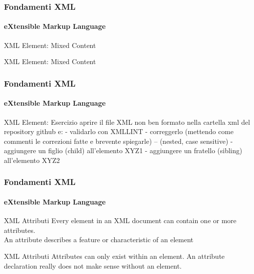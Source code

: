 \begin{frame}
    \frametitle{Fondamenti XML}
    \framesubtitle{eXtensible Markup Language}
    \addtocounter{nframe}{1}

	\begin{block}{XML Element: Mixed Content}
	\end{block}

	\begin{block}{XML Element: Mixed Content}
		\texttt{
			} 
	\end{block}


\end{frame}

\begin{frame}
    \frametitle{Fondamenti XML}
    \framesubtitle{eXtensible Markup Language}
    \addtocounter{nframe}{1}

	\begin{block}{XML Element: Esercizio}
 aprire il file XML non ben formato nella cartella xml del repository github e:
 - validarlo con XMLLINT
 - correggerlo (mettendo come commenti le correzioni fatte e brevente spiegarle)
 -- (nested, case sensitive)
 - aggiungere un figlio (child) all'elemento XYZ1
 - aggiungere un fratello (sibling) all'elemento XYZ2 
	\end{block}

\end{frame}


\begin{frame}
    \frametitle{Fondamenti XML}
    \framesubtitle{eXtensible Markup Language}
    \addtocounter{nframe}{1}

	\begin{block}{XML Attributi}
		Every element in an XML document can contain one or more attributes.
		\\An attribute describes a feature or characteristic of an element
	\end{block}

	\begin{block}{XML Attributi}
		Attributes can only exist within an element. An attribute declaration really does not make sense without an element.
	\end{block}

\end{frame}


